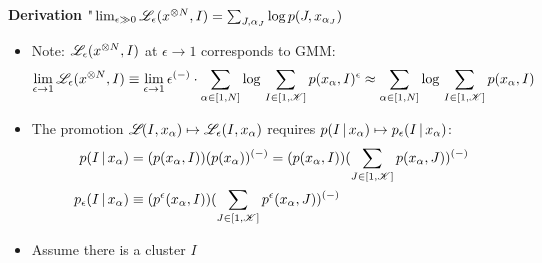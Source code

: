 \begin{frame} [t] 
      {\bf Derivation}
    $   \textnormal{"}
        \lim _{\epsilon \gg 0} 
        \mathscr {L} _{\epsilon} 
        (x ^{\otimes N}, I)  
      = 
      \sum _{J, \alpha _{J}}  
            \textnormal{log}\,  
                p (J, x _{\alpha _{J}}) 
    $
    \begin{itemize}
        \item Note: 
           $ \mathscr {L} _{\epsilon} 
               (x ^{\otimes N}, I)
           $ 
           at $\epsilon \rightarrow 1$ 
           corresponds to GMM:
            {\footnotesize
            \begin{align*}
              \lim _{\epsilon \rightarrow 1}
                \mathscr {L} _{\epsilon} 
                 (x ^{\otimes N}, I) 
              \equiv 
               \lim _{\epsilon \rightarrow 1}
               \epsilon ^{(-)} \cdot 
               \sum _{\alpha \in [1, N]} 
               \textnormal{log}\,
               \sum _{I \in [1,\mathscr{K}]}
                p (x _{\alpha} , I )
                  ^{\epsilon}
              \approx 
                \sum _{\alpha \in [1, N]} 
                \textnormal{log}\, 
                \sum _{I \in [1, \mathscr{K}]}
                p (x _{\alpha} , I )
            \end{align*}    
            }
        \item 
            The promotion
            $ \mathscr {L} _{} (I, x _{\alpha}) 
              \mapsto 
              \mathscr {L} _{\epsilon} (I, x _{\alpha}) 
            $ requires 
            $ p ( I \,\vert\, x _{\alpha} )
              \mapsto
              p _{\epsilon} 
              ( I \,\vert\, x _{\alpha} )
            $:
            { \footnotesize 
            \begin{align*} 
              p ( I \,\vert\, x _{\alpha} ) 
            & = 
               (p(x_{\alpha}, I)
               )
               (p(x_{\alpha}) )^{(-)}
              = 
               (p(x_{\alpha}, I)
               )
               (\sum _{J\in[1,\mathscr{K}]}
               p(x_{\alpha}, J) )^{(-)}
            \\  
              p _{\epsilon} 
                ( I \,\vert\, x _{\alpha} )
            & \equiv 
               ( p ^{\epsilon}
                   (x_{\alpha}, I)
               )
               ( \sum _{J\in[1,\mathscr{K}]}
                  p ^{\epsilon} (x_{\alpha}, J) 
               ) ^{(-)}
            \end{align*}
            }
        \item Assume there is a cluster $I$ 

\end{itemize}
\end{frame}

